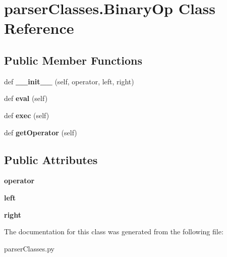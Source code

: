 \hypertarget{classparser_classes_1_1_binary_op}{}\section{parser\+Classes.\+Binary\+Op Class Reference}
\label{classparser_classes_1_1_binary_op}
\subsection*{Public Member Functions}
\begin{DoxyCompactItemize}
\item 
def {\bfseries \+\_\+\+\_\+init\+\_\+\+\_\+} (self, operator, left, right)\hypertarget{classparser_classes_1_1_binary_op_a554daa9084dec66629f4b9582793555d}{}\label{classparser_classes_1_1_binary_op_a554daa9084dec66629f4b9582793555d}

\item 
def {\bfseries eval} (self)\hypertarget{classparser_classes_1_1_binary_op_af5b9586e9192fbd0e829d4f514cd7647}{}\label{classparser_classes_1_1_binary_op_af5b9586e9192fbd0e829d4f514cd7647}

\item 
def {\bfseries exec} (self)\hypertarget{classparser_classes_1_1_binary_op_a44c9156cf60631383bc9147b61604ba4}{}\label{classparser_classes_1_1_binary_op_a44c9156cf60631383bc9147b61604ba4}

\item 
def {\bfseries get\+Operator} (self)\hypertarget{classparser_classes_1_1_binary_op_ae7a261476e32638d9ce21cc311c86a85}{}\label{classparser_classes_1_1_binary_op_ae7a261476e32638d9ce21cc311c86a85}

\end{DoxyCompactItemize}
\subsection*{Public Attributes}
\begin{DoxyCompactItemize}
\item 
{\bfseries operator}\hypertarget{classparser_classes_1_1_binary_op_a4fd8150b750a4dcdaaccedc83ef3d679}{}\label{classparser_classes_1_1_binary_op_a4fd8150b750a4dcdaaccedc83ef3d679}

\item 
{\bfseries left}\hypertarget{classparser_classes_1_1_binary_op_acf5520d9ff520e7477caff66289a3206}{}\label{classparser_classes_1_1_binary_op_acf5520d9ff520e7477caff66289a3206}

\item 
{\bfseries right}\hypertarget{classparser_classes_1_1_binary_op_a333e735c904ef6750472deba2fd9d85f}{}\label{classparser_classes_1_1_binary_op_a333e735c904ef6750472deba2fd9d85f}

\end{DoxyCompactItemize}


The documentation for this class was generated from the following file\+:\begin{DoxyCompactItemize}
\item 
parser\+Classes.\+py\end{DoxyCompactItemize}
